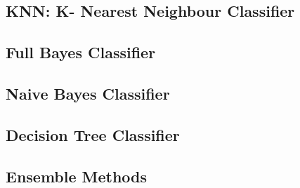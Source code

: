 \documentclass{article}
\begin{document}
    \subsection{KNN: K- Nearest Neighbour Classifier}
        
    \subsection{Full Bayes Classifier}
        
    \subsection{Naive Bayes Classifier}
        
    \newpage
    \subsection{Decision Tree Classifier}
        
    \newpage
    \subsection{Ensemble Methods}
        
\end{document}
